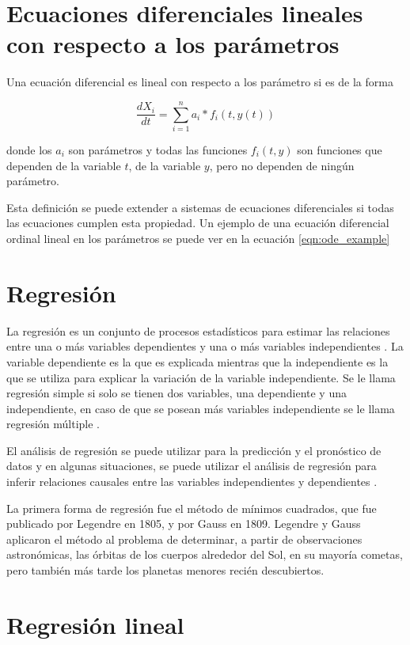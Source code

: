 \section{Ecuaciones diferenciales lineales con respecto a los parámetros}

Una ecuación diferencial es lineal con respecto a los parámetro si es de la forma

$$\frac{dX_i}{dt} = \sum_{i=1}^{n} a_i * f_i(t, y(t))$$

donde los $a_i$ son parámetros y todas las funciones $f_i(t,y)$ son funciones que dependen de la variable $t$, de la variable $y$, pero no dependen de ningún parámetro.

Esta definición se puede extender a sistemas de ecuaciones diferenciales si todas las ecuaciones cumplen esta propiedad. Un ejemplo de una ecuación diferencial ordinal lineal en los parámetros se puede ver en la ecuación \ref{eqn:ode_example}

\section{Regresión}

La regresión es un conjunto de procesos estadísticos para estimar las relaciones entre una o más variables dependientes y una o más variables independientes \cite{johnson2015applied}. La variable dependiente es la que es explicada mientras que la independiente es la que se utiliza para explicar la variación de la variable independiente. Se le llama regresión simple si solo se tienen dos variables, una dependiente y una independiente, en caso de que se posean más variables independiente se le llama regresión múltiple \cite{mann2007introductory}.

El análisis de regresión se puede utilizar para la predicción y el pronóstico de datos y en algunas situaciones, se puede utilizar el análisis de regresión para inferir relaciones causales entre las variables independientes y dependientes \cite{mann2007introductory}.

La primera forma de regresión fue el método de mínimos cuadrados, que fue publicado por Legendre en 1805, y por Gauss en 1809. Legendre y Gauss aplicaron el método al problema de determinar, a partir de observaciones astronómicas, las órbitas de los cuerpos alrededor del Sol, en su mayoría cometas, pero también más tarde los planetas menores recién descubiertos.

\section{Regresión lineal}

